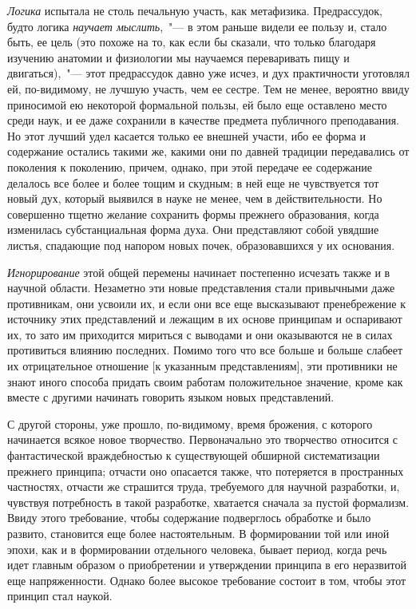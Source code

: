 \emph{Логика} испытала не столь печальную участь, как метафизика.
Предрассудок, будто логика \emph{научает мыслить},~"---
в этом раньше видели ее пользу и, стало быть,
ее цель (это похоже на то, как если бы сказали, что
только благодаря изучению анатомии и физиологии мы
научаемся переваривать пищу и двигаться),~"--- этот предрассудок
давно уже исчез, и дух практичности уготовлял
ей, по-видимому, не лучшую участь, чем ее сестре. Тем
не менее, вероятно ввиду приносимой ею некоторой формальной
пользы, ей было еще оставлено место среди наук,
и ее даже сохранили в качестве предмета публичного
преподавания. Но этот лучший удел касается только ее
внешней участи, ибо ее форма и содержание остались
такими же, какими они по давней традиции передавались
от поколения к поколению, причем, однако, при
этой передаче ее содержание делалось все более и более
тощим и скудным; в ней еще не чувствуется тот новый
дух, который выявился в науке не менее, чем в действительности.
Но совершенно тщетно желание сохранить
формы прежнего образования, когда изменилась субстанциальная
форма духа. Они представляют собой увядшие
листья, спадающие под напором новых почек, образовавшихся
у их основания.

\emph{Игнорирование} этой общей перемены начинает постепенно
исчезать также и в научной области. Незаметно
эти новые представления стали привычными даже
противникам, они усвоили их, и если они все еще высказывают
пренебрежение к источнику этих представлений
и лежащим в их основе принципам и оспаривают
их, то зато им приходится мириться с выводами и они
оказываются не в силах противиться влиянию последних.
Помимо того что все больше и больше слабеет их
отрицательное отношение [к указанным представлениям],
эти противники не знают иного способа придать своим работам
положительное значение, кроме как вместе с другими
начинать говорить языком новых представлений.

С другой стороны, уже прошло, по-видимому, время
брожения, с которого начинается всякое новое творчество.
Первоначально это творчество относится с фантастической
враждебностью к существующей обширной систематизации
прежнего принципа; отчасти оно опасается
также, что потеряется в пространных частностях, отчасти
же страшится труда, требуемого для научной разработки,
и, чувствуя потребность в такой разработке, хватается
сначала за пустой формализм. Ввиду этого требование,
чтобы содержание подверглось обработке и было
развито, становится еще более настоятельным. В формировании
той или иной эпохи, как и в формировании отдельного
человека, бывает период, когда речь идет главным
образом о приобретении и утверждении принципа в его
неразвитой еще напряженности. Однако более высокое
требование состоит в том, чтобы этот принцип стал
наукой.

